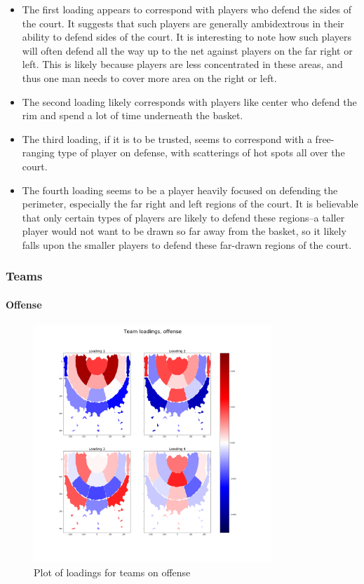 \documentclass[]{article}
\let\oldparagraph\paragraph
\renewcommand{\paragraph}[1]{\oldparagraph{#1}\mbox{}}
\begin{document}
\begin{itemize}
\item
  The first loading appears to correspond with players who defend the
  sides of the court. It suggests that such players are generally
  ambidextrous in their ability to defend sides of the court. It is
  interesting to note how such players will often defend all the way up
  to the net against players on the far right or left. This is likely
  because players are less concentrated in these areas, and thus one man
  needs to cover more area on the right or left.
\item
  The second loading likely corresponds with players like center who
  defend the rim and spend a lot of time underneath the basket.
\item
  The third loading, if it is to be trusted, seems to correspond with a
  free-ranging type of player on defense, with scatterings of hot spots
  all over the court.
\item
  The fourth loading seems to be a player heavily focused on defending
  the perimeter, especially the far right and left regions of the court.
  It is believable that only certain types of players are likely to
  defend these regions--a taller player would not want to be drawn so
  far away from the basket, so it likely falls upon the smaller players
  to defend these far-drawn regions of the court.
\end{itemize}

\hypertarget{teams}{%
\subsubsection{Teams}\label{teams}}

\hypertarget{offense-1}{%
\paragraph{Offense}\label{offense-1}}

\begin{figure}
\centering
\includegraphics[width=0.8\textwidth,height=\textheight]{first_4_loadings_teams_off.png}
\caption{Plot of loadings for teams on offense}
\end{figure}
\end{document}
